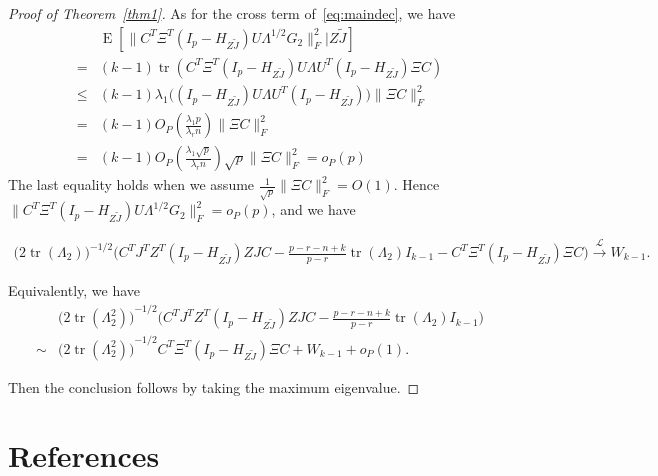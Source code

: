 \documentclass[review]{elsarticle}
\DeclareMathOperator{\mytr}{tr}
\DeclareMathOperator{\myE}{E}
\theoremstyle{plain}
\theoremstyle{definition}
\theoremstyle{remark}
\begin{document}
\begin{proof}[\textrm{Proof of Theorem~\ref{thm1}}]
As for the cross term of~\eqref{eq:maindec}, we have
$$
\begin{aligned}
    &\myE [\|C^T \Xi^T (I_p -H_{Z\tilde{J}})U\Lambda^{1/2}G_2\|_F^2|Z\tilde{J}]\\
    = &
    (k-1)\mytr(C^T \Xi^T (I_p -H_{Z\tilde{J}})U\Lambda U^T (I_p -H_{Z\tilde{J}})\Xi C)\\
    \leq &
    (k-1)\lambda_1\big((I_p -H_{Z\tilde{J}})U\Lambda U^T (I_p -H_{Z\tilde{J}})\big)\|\Xi C\|^2_F\\
    = &
    (k-1) O_P(\frac{\lambda_1 p}{\lambda_r n})  \|\Xi C\|^2_F\\
    = &
    (k-1) O_P(\frac{\lambda_1 \sqrt{p}}{\lambda_r n}) \sqrt{p}  \|\Xi C\|^2_F=o_P(p)
\end{aligned}
$$
The last equality holds when we assume $\frac{1}{\sqrt{p}}\|\Xi C\|_F^2=O(1)$. Hence $\|C^T \Xi^T (I_p -H_{Z\tilde{J}})U\Lambda^{1/2}G_2\|_F^2=o_P(p)$, and we have

$$
\begin{aligned}
    \Big(2 \mytr(\Lambda_2) \Big)^{-1/2}
    \big( C^TJ^T Z^T(I_p-H_{Z\tilde J}) ZJC
    -\tfrac{p-r-n+k}{p-r}\mytr(\Lambda_2)I_{k-1} -C^T \Xi^T (I_p-H_{Z\tilde{J}})\Xi C\big)
\xrightarrow{\mathcal{L}} W_{k-1}.
\end{aligned}
$$

    Equivalently, we have
    $$
    \begin{aligned}
        &{\Big(2\mytr (\Lambda_2^2)\Big)}^{-1/2}{\Big(C^TJ^T Z^T(I_p-H_{Z\tilde J}) ZJC- \frac{p-r-n+k}{p-r}\mytr(\Lambda_2)I_{k-1}}\Big)\\
        \sim&
        {\Big(2\mytr (\Lambda_2^2)\Big)}^{-1/2} C^T \Xi^T (I_p-H_{Z\tilde{J}})\Xi C
        +W_{k-1}+o_P(1).
    \end{aligned}
    $$

    Then the conclusion follows by taking the maximum eigenvalue.
\end{proof}






\section*{References}


\end{document}
